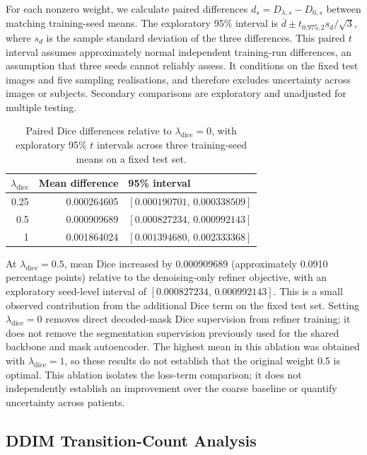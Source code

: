 \documentclass[jimaging,article,submit,pdftex,moreauthors]{Definitions/mdpi}%
\begin{document}
For each nonzero weight, we calculate paired differences $d_s=D_{\lambda,s}-D_{0,s}$ between matching training-seed means. The exploratory 95\% interval is $\overline{d}\pm t_{0.975,2}s_d/\sqrt{3}$, where $s_d$ is the sample standard deviation of the three differences. This paired $t$ interval assumes approximately normal independent training-run differences, an assumption that three seeds cannot reliably assess. It conditions on the fixed test images and five sampling realisations, and therefore excludes uncertainty across images or subjects. Secondary comparisons are exploratory and unadjusted for multiple testing.



\begin{table}[htbp]
\centering
\caption{Paired Dice differences relative to $\lambda_{\mathrm{dice}}=0$, with exploratory 95\% $t$ intervals across three training-seed means on a fixed test set.}
\label{tab:dice_weight_seed_intervals}
\small
\begin{tabular}{rrl}
\toprule
$\lambda_{\mathrm{dice}}$ & Mean difference & 95\% interval \\
\midrule
0.25 & 0.000264605 & $[0.000190701,\,0.000338509]$ \\
0.5 & 0.000909689 & $[0.000827234,\,0.000992143]$ \\
1 & 0.001864024 & $[0.001394680,\,0.002333368]$ \\
\bottomrule
\end{tabular}
\end{table}



At $\lambda_{\mathrm{dice}}=0.5$, mean Dice increased by 0.000909689 (approximately 0.0910 percentage points) relative to the denoising-only refiner objective, with an exploratory seed-level interval of $[0.000827234,\,0.000992143]$. This is a small observed contribution from the additional Dice term on the fixed test set. Setting $\lambda_{\mathrm{dice}}=0$ removes direct decoded-mask Dice supervision from refiner training; it does not remove the segmentation supervision previously used for the shared backbone and mask autoencoder. The highest mean in this ablation was obtained with $\lambda_{\mathrm{dice}}=1$, so these results do not establish that the original weight 0.5 is optimal. This ablation isolates the loss-term comparison; it does not independently establish an improvement over the coarse baseline or quantify uncertainty across patients.



\subsection{DDIM Transition-Count Analysis}
\end{document}
